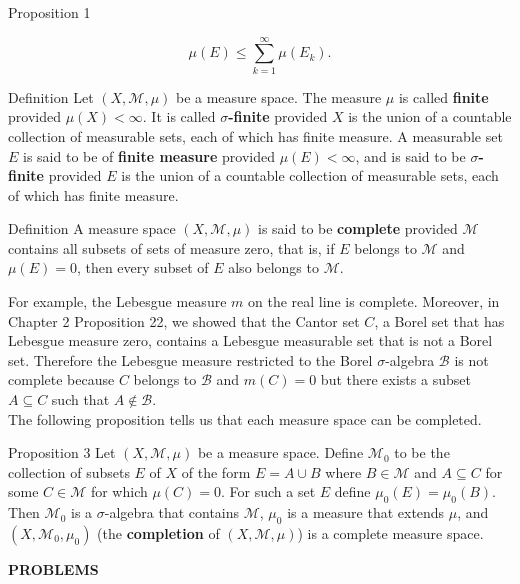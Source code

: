 \begin{flushleft}
\begin{namedthm*}{Proposition 1}
\begin{enumerate}[\indent {}]
			\[
				\mu(E)\le\sum_{k=1}^\infty\mu(E_k).	
			\]
		\end{enumerate}
	\end{namedthm*}
	\begin{namedthm*}{Definition}
		Let $(X,\mathcal{M},\mu)$ be a measure space. 
		The measure $\mu$ is called \textbf{finite} provided $\mu(X)<\infty$. 
		It is called \textbf{$\sigma$-finite} provided $X$ is the union of a countable collection of measurable sets, each of which has finite measure.
		A measurable set $E$ is said to be of \textbf{finite measure} provided $\mu(E)<\infty$, and is said to be \textbf{$\sigma$-finite} provided $E$ is the union of a countable collection of measurable sets, each of which has finite measure.
	\end{namedthm*}
	\begin{namedthm*}{Definition}
		A measure space $(X,\mathcal{M},\mu)$ is said to be \textbf{complete} provided $\mathcal{M}$ contains all subsets of sets of measure zero, that is, if $E$ belongs to $\mathcal{M}$ and $\mu(E)=0$, then every subset of $E$ also belongs to $\mathcal{M}$.
	\end{namedthm*}
	For example, the Lebesgue measure $m$ on the real line is complete. 
	Moreover, in Chapter 2 Proposition 22, we showed that the Cantor set $C$, a Borel set that has Lebesgue measure zero, contains a Lebesgue measurable set that is not a Borel set.
	Therefore the Lebesgue measure restricted to the Borel $\sigma$-algebra $\mathcal{B}$ is not complete because $C$ belongs to $\mathcal{B}$ and $m(C)=0$ but there exists a subset $A\subseteq C$ such that $A\notin\mathcal{B}$.\\
	\medskip
	The following proposition tells us that each measure space can be completed.
	\begin{namedthm*}{Proposition 3}
		Let $(X,\mathcal{M},\mu)$ be a measure space.
		Define $\mathcal{M}_0$ to be the collection of subsets $E$ of $X$ of the form $E=A\cup B$ where $B\in\mathcal{M}$ and $A\subseteq C$ for some $C\in\mathcal{M}$ for which $\mu(C)=0$.
		For such a set $E$ define $\mu_0(E)=\mu_0(B)$. 
		Then $\mathcal{M}_0$ is a $\sigma$-algebra that contains $\mathcal{M}$, $\mu_0$ is a measure that extends $\mu$, and $(X,\mathcal{M}_0,\mu_0)$ (the \textbf{completion} of $(X,\mathcal{M},\mu)$) is a complete measure space.
	\end{namedthm*}
\end{flushleft}
\begin{center}
	\textbf{PROBLEMS}
\end{center}
